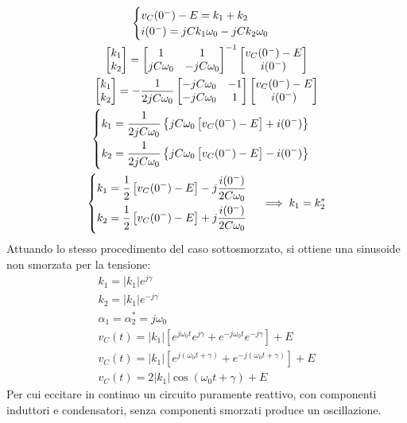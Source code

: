 \documentclass{article}
\numberwithin{equation}{subsection}
\begin{document}
\begin{gather*}
    \begin{cases}
        v_C(0^-)-E=k_1+k_2\\
        i(0^-)=jCk_1\omega_0-jCk_2\omega_0
    \end{cases}\\
    \begin{bmatrix}
        k_1\\k_2
    \end{bmatrix}=
    \begin{bmatrix}
        1&1\\jC\omega_0&-jC\omega_0 
    \end{bmatrix}^{-1}
    \begin{bmatrix}
        v_C(0^-)-E\\i(0^-)
    \end{bmatrix}\\
    \begin{bmatrix}
        k_1\\k_2
    \end{bmatrix}=\displaystyle-\frac{1}{2jC\omega_0}
    \begin{bmatrix}
        -jC\omega_0&-1\\-jC\omega_0&1
    \end{bmatrix}
    \begin{bmatrix}
        v_C(0^-)-E\\i(0^-)
    \end{bmatrix}\\
    \begin{cases}
        k_1=\displaystyle\frac{\strut 1}{\strut 2jC\omega_0}\left\{jC\omega_0\left[v_C(0^-)-E\right]+i(0^-)\right\}\\
        k_2=\displaystyle\frac{\strut 1}{\strut 2jC\omega_0}\left\{jC\omega_0\left[v_C(0^-)-E\right]-i(0^-)\right\}
    \end{cases}\\
    \begin{cases}
        k_1=\displaystyle\frac{\strut 1}{\strut 2}\left[v_C(0^-)-E\right]-j\frac{i(0^-)}{2C\omega_0}\\
        k_2=\displaystyle\frac{1\strut }{\strut 2}\left[v_C(0^-)-E\right]+j\frac{i(0^-)}{2C\omega_0}
    \end{cases}\implies k_1=k_2^*
\end{gather*}
Attuando lo stesso procedimento del caso sottosmorzato, si ottiene una sinusoide non smorzata per la tensione:
\begin{gather*}
    k_1=|k_1|e^{j\gamma}\\
    k_2=|k_1|e^{-j\gamma}\\
    \alpha_1=\alpha_2^*=j\omega_0\\
    v_C(t)=|k_1|\left[e^{j\omega_0t}e^{j\gamma}+e^{-j\omega_0t}e^{-j\gamma}\right]+E\\
    v_C(t)=|k_1|\left[e^{j(\omega_0t+\gamma)}+e^{-j(\omega_0t+\gamma)}\right]+E\\
    v_C(t)=2|k_1|\cos(\omega_0t+\gamma)+E
\end{gather*}
Per cui eccitare in continuo un circuito puramente reattivo, con componenti induttori e condensatori, senza componenti smorzati produce un oscillazione. 
\end{document}
